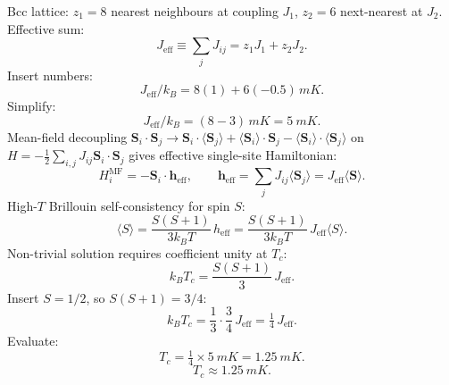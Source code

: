\documentclass[11pt]{article}
\begin{document}
Bcc lattice: $z_1=8$ nearest neighbours at coupling $J_1$, $z_2=6$ next-nearest at $J_2$. Effective sum:
\[
J_{\text{eff}} \equiv \sum_j J_{ij} = z_1 J_1 + z_2 J_2.
\]
Insert numbers:
\[
J_{\text{eff}}/k_B = 8(1) + 6(-0.5)\,\si{mK}.
\]
Simplify:
\[
J_{\text{eff}}/k_B = (8 - 3)\,\si{mK} = \SI{5}{mK}.
\]
Mean-field decoupling $\bm S_i\cdot\bm S_j\to\bm S_i\cdot\langle\bm S_j\rangle + \langle\bm S_i\rangle\cdot\bm S_j - \langle\bm S_i\rangle\cdot\langle\bm S_j\rangle$ on $H=-\tfrac12\sum_{i,j}J_{ij}\bm S_i\cdot\bm S_j$ gives effective single-site Hamiltonian:
\[
H_i^{\text{MF}} = -\bm S_i\cdot\bm h_{\text{eff}},\qquad \bm h_{\text{eff}} = \sum_j J_{ij}\langle\bm S_j\rangle = J_{\text{eff}}\langle\bm S\rangle.
\]
High-$T$ Brillouin self-consistency for spin $S$:
\[
\langle S\rangle = \frac{S(S+1)}{3 k_B T}\, h_{\text{eff}} = \frac{S(S+1)}{3 k_B T}\, J_{\text{eff}}\langle S\rangle.
\]
Non-trivial solution requires coefficient unity at $T_c$:
\[
k_B T_c = \frac{S(S+1)}{3}\, J_{\text{eff}}.
\]
Insert $S=1/2$, so $S(S+1)=3/4$:
\[
k_B T_c = \frac{1}{3}\cdot\frac{3}{4}\, J_{\text{eff}} = \tfrac{1}{4}\, J_{\text{eff}}.
\]
Evaluate:
\[
T_c = \tfrac{1}{4}\times \SI{5}{mK} = \SI{1.25}{mK}.
\]
\[
\boxed{\;T_c \approx \SI{1.25}{mK}.\;}
\]
\end{document}
